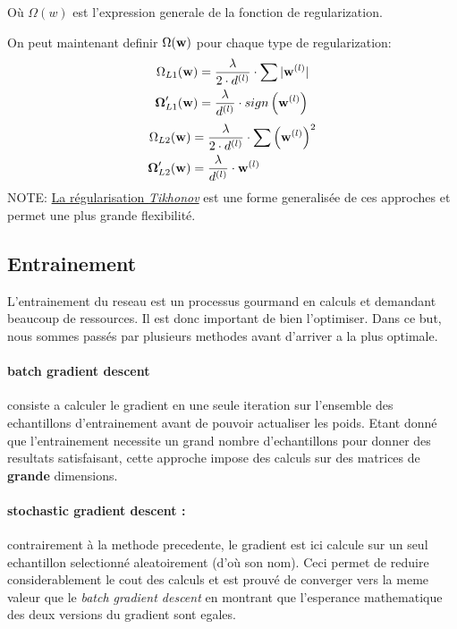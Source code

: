 \documentclass[11pt]{article}
\begin{document}
O\`u $\Omega(w)$ est l'expression generale de la fonction de regularization.

On peut maintenant definir $\Omega({\bf w})$ pour chaque type de regularization:
\begin{equation}
	\begin{aligned}
		\Omega_{L1} ({\bf w}) &= \frac{\lambda}{2\cdot d^{(l)}} \cdot \sum{|{\bf w}^{(l)}|}\\
		\boldsymbol\Omega_{L1}'({\bf w}) &= \frac{\lambda}{d^{(l)}} \cdot sign\left ({\bf w}^{(l)} \right)\\
	\end{aligned}
\end{equation}
\begin{equation}
	\begin{aligned}
		\Omega_{L2} ({\bf w}) &= \frac{\lambda}{2\cdot d^{(l)}} \cdot \sum{\left({\bf w}^{(l)}\right) ^2}\\
		\boldsymbol\Omega_{L2}'({\bf w}) &= \frac{\lambda}{d^{(l)}} \cdot {\bf w}^{(l)}\\
	\end{aligned}
\end{equation}
NOTE: \href{http://work.caltech.edu/slides/slides12.pdf}{La r\'egularisation
\emph{Tikhonov}} est une forme generalis\'ee de ces approches et permet une
plus grande flexibilit\'e.

\subsection{Entrainement}
L'entrainement du reseau est un processus gourmand en calculs et demandant
beaucoup de ressources. Il est donc important de bien l'optimiser. Dans ce but,
nous sommes pass\'es par plusieurs methodes avant d'arriver a la plus optimale.

\paragraph{batch gradient descent} consiste a calculer le gradient en une seule
iteration sur l'ensemble des echantillons d'entrainement avant de pouvoir
actualiser les poids. Etant donn\'e que l'entrainement necessite un grand
nombre d'echantillons pour donner des resultats satisfaisant, cette approche
impose des calculs sur des matrices de {\bf grande} dimensions.

\paragraph{stochastic gradient descent : } contrairement \`a la methode
precedente, le gradient est ici calcule sur un seul echantillon selectionn\'e
aleatoirement (d'o\`u son nom). Ceci permet de reduire considerablement le
cout des calculs et est prouv\'e de converger vers la meme valeur que le
\emph{batch gradient descent} en montrant que l'esperance mathematique des deux
versions du gradient sont egales.
\end{document}
